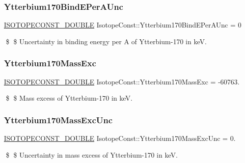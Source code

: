 \subsubsection{\texorpdfstring{Ytterbium170\+Bind\+E\+Per\+A\+Unc}{Ytterbium170BindEPerAUnc}}
{\footnotesize\ttfamily \mbox{\hyperlink{group___isotope_const-_macros_ga8f45a7272ce02c0b4c65c44636ed719a}{I\+S\+O\+T\+O\+P\+E\+C\+O\+N\+S\+T\+\_\+\+D\+O\+U\+B\+LE}} Isotope\+Const\+::\+Ytterbium170\+Bind\+E\+Per\+A\+Unc = 0}

\$ \$ Uncertainty in binding energy per A of Ytterbium-\/170 in keV. \mbox{\label{group___isotope_const-_ytterbium-_yb170_gafeaa1752d6f5b9306ad490d41fa57647}} 
\subsubsection{\texorpdfstring{Ytterbium170\+Mass\+Exc}{Ytterbium170MassExc}}
{\footnotesize\ttfamily \mbox{\hyperlink{group___isotope_const-_macros_ga8f45a7272ce02c0b4c65c44636ed719a}{I\+S\+O\+T\+O\+P\+E\+C\+O\+N\+S\+T\+\_\+\+D\+O\+U\+B\+LE}} Isotope\+Const\+::\+Ytterbium170\+Mass\+Exc = -\/60763.}

\$ \$ Mass excess of Ytterbium-\/170 in keV. \mbox{\label{group___isotope_const-_ytterbium-_yb170_ga5445d5ba19fa8e196ff418bb73ec779f}} 
\subsubsection{\texorpdfstring{Ytterbium170\+Mass\+Exc\+Unc}{Ytterbium170MassExcUnc}}
{\footnotesize\ttfamily \mbox{\hyperlink{group___isotope_const-_macros_ga8f45a7272ce02c0b4c65c44636ed719a}{I\+S\+O\+T\+O\+P\+E\+C\+O\+N\+S\+T\+\_\+\+D\+O\+U\+B\+LE}} Isotope\+Const\+::\+Ytterbium170\+Mass\+Exc\+Unc = 0.}

\$ \$ Uncertainty in mass excess of Ytterbium-\/170 in keV. \mbox{\label{group___isotope_const-_ytterbium-_yb170_ga01381f0eed9696db8fe46e85b7ef54c8}} 
